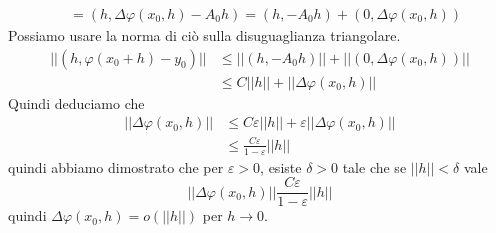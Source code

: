 \documentclass[a4paper]{article}
\begin{document}
\begin{radioactive}
\begin{snippetproof}{}
\begin{align*}
        &= (h, \Delta \varphi(x_0, h) - A_0h)
        = (h, -A_0h) + (0, \Delta \varphi(x_0, h))
    \end{align*}
    Possiamo usare la norma di ciò sulla disuguaglianza triangolare.
    \begin{align*}
        ||(h, \varphi(x_0 + h) - y_0)|| &\leq
        ||(h, -A_0h)|| + ||(0, \Delta \varphi(x_0, h))|| \\
        &\leq C||h|| + ||\Delta \varphi(x_0, h)||
    \end{align*}
    Quindi deduciamo che
    \begin{align*}
        ||\Delta \varphi(x_0, h)|| &\leq C\varepsilon||h|| +
        \varepsilon||\Delta \varphi (x_0, h)|| \\
        &\leq \frac{C \varepsilon}{1 - \varepsilon}||h||
    \end{align*}
    quindi abbiamo dimostrato che per \(\varepsilon>0\), esiste \(\delta>0\)
    tale che se \(||h|| < \delta\)
    vale \[
        ||\Delta \varphi(x_0, h)|| \frac{C \varepsilon}{1 - \varepsilon}||h||
    \]
    quindi \(\Delta \varphi(x_0, h) = o(||h||)\) per \(h\to 0\).
\end{snippetproof}
\end{radioactive}
\end{document}

